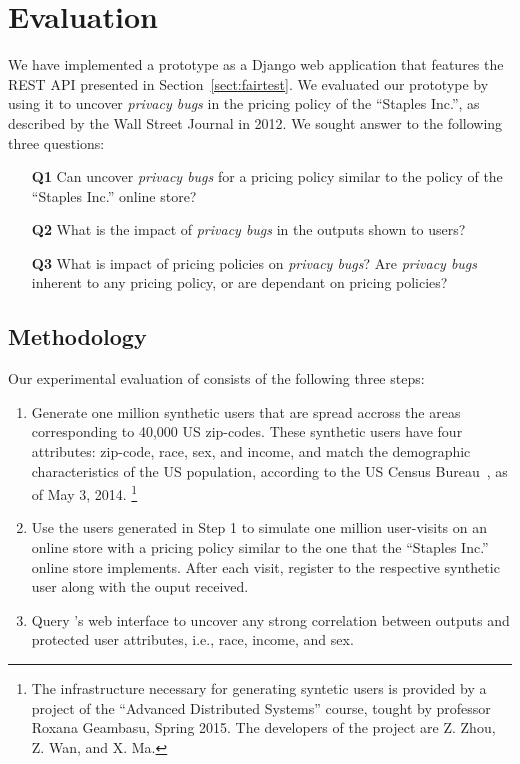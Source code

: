 \section{Evaluation}
\label{sect:evaluation}

We have implemented a \sysname prototype as a Django web application
that features the REST API presented in Section~\ref{sect:fairtest}.
We evaluated our prototype by using it to uncover {\it privacy bugs}
in the pricing policy of the ``Staples Inc.'', as described by the
Wall Street Journal in 2012. We sought answer to the following three
questions:

\begin{enumerate}
  \item[{\bf Q1}] Can \sysname uncover {\em privacy bugs} for
    a pricing policy similar to the policy of the ``Staples Inc.''
    online store?
  \item[{\bf Q2}] What is the impact of {\em privacy bugs} in the outputs
    shown to users?
  \item[{\bf Q3}] What is impact of pricing policies on {\em privacy bugs}?
    Are {\em privacy bugs} inherent to any pricing policy, or are
    dependant on pricing policies?
\end{enumerate}

\subsection{\normalsize Methodology}
Our experimental evaluation of \sysname consists of the following three steps:

\begin{enumerate}
  \item
  Generate one million synthetic users that are spread accross the
  areas corresponding to 40,000 US zip-codes. These synthetic users
  have four attributes: zip-code, race, sex, and income, and match
  the demographic characteristics of the US population, according to
  the US Census Bureau~\cite{CensusBureau}, as of May 3, 2014.
  \footnote{
    The infrastructure necessary for generating syntetic users is
    provided by a project of the ``Advanced Distributed Systems'' course,
    tought by professor Roxana Geambasu, Spring 2015. The developers of the
    project are Z. Zhou, Z. Wan, and X. Ma.
  }

  \item
  Use the users generated in Step 1 to simulate one million user-visits on
  an online store with a pricing policy similar to the one that the
  ``Staples Inc.'' online store implements. After each visit,
  register to \sysname the respective synthetic user along with the ouput
  received.

  \item
  Query \sysname's web interface to uncover any strong correlation between
  outputs and protected user attributes, i.e., race, income, and sex.
\end{enumerate}

